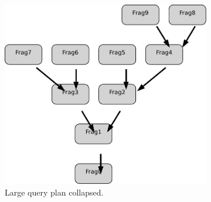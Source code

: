 \documentclass{chi2009}
\begin{document}



\begin{figure}[ht]
  \centering
  \begin{subfigure}[b]{0.49\columnwidth}
    \includegraphics[width=0.8\columnwidth]{images/graph_collapsed}
    \caption{Large query plan collapsed.}
    \label{fig:graph}
  \end{subfigure}
  \begin{subfigure}[b]{0.49\columnwidth}

\end{subfigure}
\end{figure}
\end{document}

